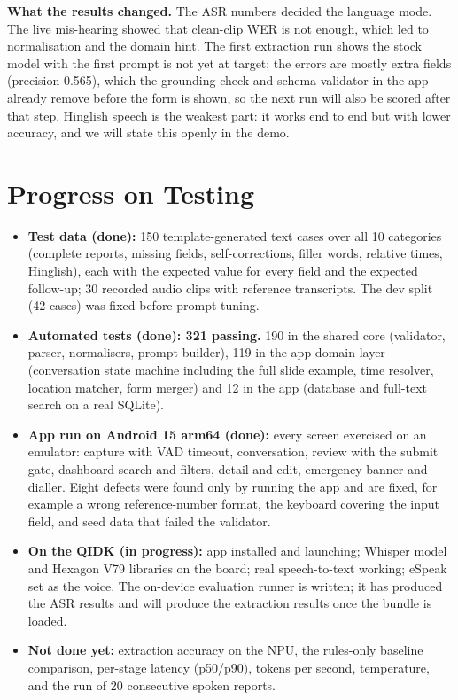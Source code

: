 \documentclass[9pt,a4paper]{extarticle}
\begin{document}
\textbf{What the results changed.} The ASR numbers decided the language mode. The live mis-hearing showed that clean-clip WER is not enough, which led to normalisation and the domain hint. The first extraction run shows the stock model with the first prompt is not yet at target; the errors are mostly extra fields (precision 0.565), which the grounding check and schema validator in the app already remove before the form is shown, so the next run will also be scored after that step. Hinglish speech is the weakest part: it works end to end but with lower accuracy, and we will state this openly in the demo.

\section{Progress on Testing}
\begin{itemize}
\item \textbf{Test data (done):} 150 template-generated text cases over all 10 categories (complete reports, missing fields, self-corrections, filler words, relative times, Hinglish), each with the expected value for every field and the expected follow-up; 30 recorded audio clips with reference transcripts. The dev split (42 cases) was fixed before prompt tuning.
\item \textbf{Automated tests (done): 321 passing.} 190 in the shared core (validator, parser, normalisers, prompt builder), 119 in the app domain layer (conversation state machine including the full slide example, time resolver, location matcher, form merger) and 12 in the app (database and full-text search on a real SQLite).
\item \textbf{App run on Android 15 arm64 (done):} every screen exercised on an emulator: capture with VAD timeout, conversation, review with the submit gate, dashboard search and filters, detail and edit, emergency banner and dialler. Eight defects were found only by running the app and are fixed, for example a wrong reference-number format, the keyboard covering the input field, and seed data that failed the validator.
\item \textbf{On the QIDK (in progress):} app installed and launching; Whisper model and Hexagon V79 libraries on the board; real speech-to-text working; eSpeak set as the voice. The on-device evaluation runner is written; it has produced the ASR results and will produce the extraction results once the bundle is loaded.
\item \textbf{Not done yet:} extraction accuracy on the NPU, the rules-only baseline comparison, per-stage latency (p50/p90), tokens per second, temperature, and the run of 20 consecutive spoken reports.
\end{itemize}
\end{document}
